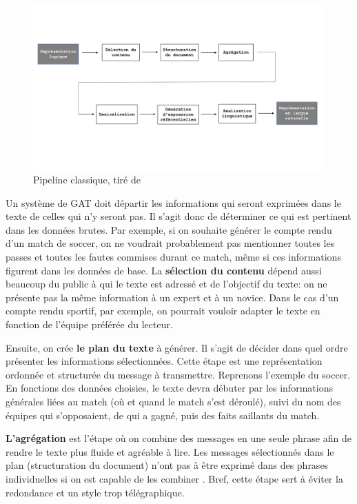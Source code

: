 \begin{figure}[htb] %
	\centering
	\includegraphics[width=1\textwidth, trim = {0cm 0cm 0cm 0cm},clip]{ch2/figs/pipeline.pdf}
	\caption{Pipeline classique, tiré de \citep{ReiterBuildingNaturalLanguage2000}}
	\label{fig:Pipeline}
\end{figure}

Un système de \ac{GAT} doit départir les informations qui seront exprimées dans le texte de celles qui n'y seront pas. Il s'agit donc de déterminer ce qui est pertinent dans les données brutes. Par exemple, si on souhaite générer le compte rendu d'un match de soccer, on ne voudrait probablement pas mentionner toutes les passes et toutes les fautes commises durant ce match, même si ces informations figurent dans les données de base. La \textbf{sélection du contenu} dépend aussi beaucoup du public à qui le texte est adressé et de l'objectif du texte: on ne présente pas la même information à un expert et à un novice. Dans le cas d'un compte rendu sportif, par exemple, on pourrait vouloir adapter le texte en fonction de l'équipe préférée du lecteur.

Ensuite, on crée \textbf{le plan du texte} à générer. Il s'agit de décider dans quel ordre présenter les informations sélectionnées. Cette étape est une représentation ordonnée et structurée du message à transmettre. Reprenons l'exemple du soccer. En fonctions des données choisies, le texte devra débuter par les informations générales liées au match (où et quand le match s'est déroulé), suivi du nom des équipes qui s'opposaient, de qui a gagné, puis des faits saillants du match.

\textbf{L'agrégation} est l'étape où on combine des messages en une seule phrase afin de rendre le texte plus fluide et agréable à lire. Les messages sélectionnés dans le plan (structuration du document) n'ont pas à être exprimé dans des phrases individuelles si on est capable de les combiner \citep{ChengCapturingInteractionAggregation2000}. Bref, cette étape sert à éviter la redondance et un style trop télégraphique.

